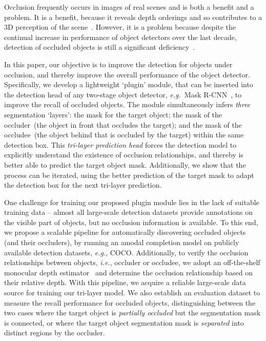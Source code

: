 \documentclass{bmvc2k}
\begin{document}
Occlusion frequently occurs in images of real scenes and is both a benefit and a problem. It is a benefit, because it reveals depth orderings and so contributes to a 3D perception of the scene~\cite{Gibson79}. However, it is a problem because despite the continual increase in performance of object detectors over the last decade,
detection of occluded objects is still a
significant deficiency~\cite{wang2020robust,yuan2021robust,ke2021bcnet}. 


In this paper, our objective is to improve the detection for objects under occlusion, and thereby improve the overall performance of the object detector. 
Specifically, we develop a lightweight `plugin' module, that can be inserted into the detection head of any two-stage object detector, 
{\em e.g.}~Mask R-CNN~\cite{mask_rcnn}, 
to improve the recall of occluded objects. 
The module simultaneously infers {\em three} segmentation `layers': the mask for the target object; the mask of the occluder~(the object in front that occludes the target); and the mask of the occludee~(the object behind that is occluded by the target) within the same detection box. This {\em tri-layer prediction head} forces the detection
 model to explicitly understand the existence of occlusion relationships, and thereby is better able to predict the target object mask. 
Additionally, we show that the process can be iterated, using the better prediction of the target mask to adapt the detection box for the next tri-layer prediction.


One challenge for training our proposed plugin module lies in the lack of suitable training data --
almost all large-scale detection datasets provide annotations on the visible part of objects, but no occlusion information is available.
To this end, we propose a scalable pipeline for automatically discovering  occluded objects (and their occluders), by running an amodal completion model on publicly available detection datasets, {\em e.g.}, COCO. 
Additionally, to verify the occlusion relationships between objects, 
{\em i.e.}, occluder or occludee,
we adopt an off-the-shelf monocular depth estimator~\cite{Ranftl2020} and determine the occlusion relationship based on their relative depth.
With this pipeline, we acquire a reliable large-scale data source for training our tri-layer model. We also
 establish an evaluation dataset to measure the recall performance for occluded objects, distinguishing between the two cases where the target object is {\em partially occluded} but the segmentation mask is connected, or where the target object segmentation mask is {\em separated} into distinct regions by the occluder.  
\end{document}
